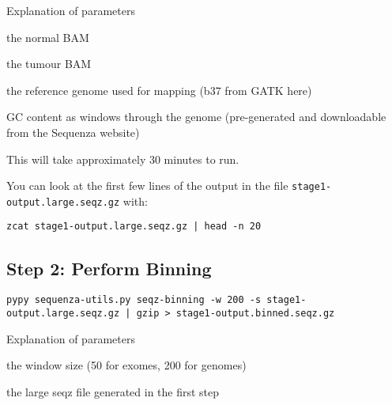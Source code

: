 \begin{note}
Explanation of parameters
\begin{description}[style=multiline,labelindent=0cm,align=right,leftmargin=\descriptionlabelspace,rightmargin=1.5cm,font=\ttfamily]
 \item[-n] the normal BAM
 \item[-t] the tumour BAM
 \item[--fasta] the reference genome used for mapping (b37 from GATK here)
 \item[-gc] GC content as windows through the genome (pre-generated and downloadable from the Sequenza website)
\end{description}
\end{note}

This will take approximately 30 minutes to run.

\begin{information}
You can look at the first few lines of the output in the file \texttt{stage1-output.large.seqz.gz} with:
 
\begin{lstlisting}
zcat stage1-output.large.seqz.gz | head -n 20
\end{lstlisting}
\end{information}


\subsection{Step 2: Perform Binning}

\begin{steps}
\begin{lstlisting}
pypy sequenza-utils.py seqz-binning -w 200 -s stage1-output.large.seqz.gz | gzip > stage1-output.binned.seqz.gz
\end{lstlisting}
\end{steps}

\begin{note}
Explanation of parameters
\begin{description}[style=multiline,labelindent=0cm,align=right,leftmargin=\descriptionlabelspace,rightmargin=1.5cm,font=\ttfamily]
 \item[-w] the window size (50 for exomes, 200 for genomes)
 \item[-s] the large seqz file generated in the first step
\end{description}
\end{note}

